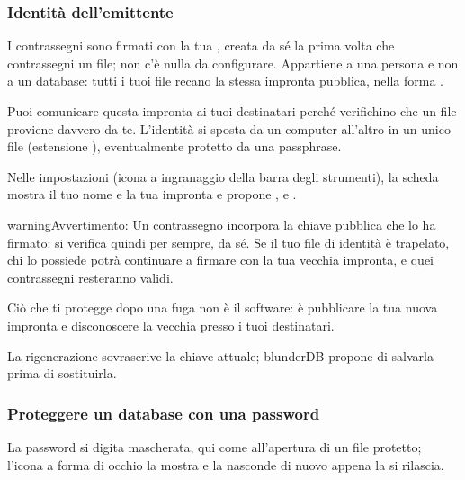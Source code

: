 \documentclass[letterpaper,10pt,italian]{sphinxmanual}
\begin{document}
\subsubsection{Identità dell’emittente}
\label{\detokenize{manuel:identite-d-emetteur}}
\sphinxAtStartPar
I contrassegni sono firmati con la tua , creata da sé la prima volta che contrassegni un file; non c’è nulla da configurare. Appartiene a una persona e non a un database: tutti i tuoi file recano la stessa impronta pubblica, nella forma .

\sphinxAtStartPar
Puoi comunicare questa impronta ai tuoi destinatari perché verifichino che un file proviene davvero da te. L’identità si sposta da un computer all’altro in un unico file (estensione ), eventualmente protetto da una passphrase. 

\sphinxAtStartPar
Nelle impostazioni (icona a ingranaggio della barra degli strumenti), la scheda  mostra il tuo nome e la tua impronta e propone ,  e .

\begin{sphinxadmonition}{warning}{Avvertimento:}
\sphinxAtStartPar
{} Un contrassegno incorpora la chiave pubblica che lo ha firmato: si verifica quindi per sempre, da sé. Se il tuo file di identità è trapelato, chi lo possiede potrà continuare a firmare con la tua vecchia impronta, e quei contrassegni resteranno validi.

\sphinxAtStartPar
Ciò che ti protegge dopo una fuga non è il software: è pubblicare la tua nuova impronta e disconoscere la vecchia presso i tuoi destinatari.

\sphinxAtStartPar
La rigenerazione sovrascrive la chiave attuale; blunderDB propone di salvarla prima di sostituirla.
\end{sphinxadmonition}


\subsubsection{Proteggere un database con una password}
\label{\detokenize{manuel:proteger-une-base-par-un-mot-de-passe}}
\sphinxAtStartPar
La password si digita mascherata, qui come all’apertura di un file protetto; l’icona a forma di occhio la mostra  e la nasconde di nuovo appena la si rilascia.
\end{document}
